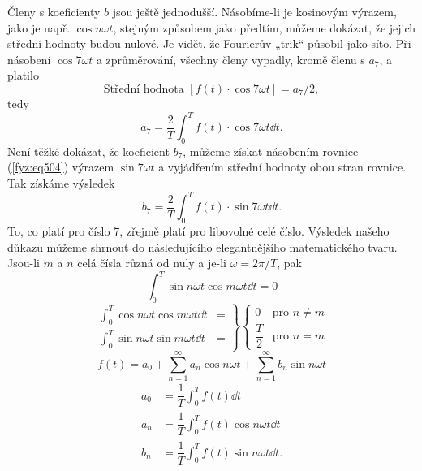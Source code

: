   Členy s koeficienty \(b\) jsou ještě jednodušší. Násobíme-li je kosinovým výrazem, jako je např.
  \(\cos n\omega t\), stejným způsobem jako předtím, můžeme dokázat, že jejich střední hodnoty budou
  nulové. Je vidět, že Fourierův „trik“ působil jako síto. Při násobení \(\cos 7\omega t\) a 
  zprůměrování, všechny členy vypadly, kromě členu s \(a_7\), a platilo 
  \begin{equation}\label{fyz:eq510}
    \text{Střední hodnota }[f(t)\cdot\cos 7\omega t] = a_7/2,
  \end{equation}
  tedy
  \begin{equation}\label{fyz:eq511}
    a_7 = \frac{2}{T}\int_0^Tf(t)\cdot\cos7\omega t \dd{t}.
  \end{equation}
   Není těžké dokázat, že koeficient \(b_7\), můžeme získat násobením rovnice (\ref{fyz:eq504}) 
   výrazem \(\sin 7\omega t\) a vyjádřením střední hodnoty obou stran rovnice. Tak získáme výsledek
  \begin{equation}\label{fyz:eq512}
    b_7 = \frac{2}{T}\int_0^Tf(t)\cdot\sin7\omega t \dd{t}.
  \end{equation}
  To, co platí pro číslo \num{7}, zřejmě platí pro libovolné celé číslo. Výsledek našeho důkazu 
  můžeme shrnout do následujícího elegantnějšího matematického tvaru. Jsou-li \(m\) a \(n\) celá 
  čísla různá od nuly a je-li \(\omega = 2\pi/T\), pak
  \begin{equation}\label{fyz:eq513}
    \int_{0}^{T}\sin n\omega t\cos m\omega t\dd{t} = 0
  \end{equation}
  \begin{equation}\label{fyz:eq514}
    \left.\begin{aligned}
           \int_{0}^{T}\cos n\omega t\cos m\omega t\dd{t} &= \\
           \int_{0}^{T}\sin n\omega t\sin m\omega t\dd{t} &=
          \end{aligned}
    \right\}
    \begin{cases} 
       0             & \text{pro } n \neq m \\
       \dfrac{T}{2}  & \text{pro } n = m
    \end{cases}
  \end{equation}
  \begin{equation}\label{fyz:eq515}
    f(t) = a_0 + \sum_{n=1}^\infty a_n\cos n\omega t + \sum_{n=1}^\infty b_n\sin n\omega t
  \end{equation}
  \begin{subequations}\label{fyz:eq516}
    \begin{align}
      a_0 &= \dfrac{1}{T}\int_{0}^{T}f(t)\dd{t}  \\
      a_n &= \dfrac{1}{T}\int_{0}^{T}f(t)\cos n\omega t\dd{t}   \\
      b_n &= \dfrac{1}{T}\int_{0}^{T}f(t)\sin n\omega t\dd{t}. 
    \end{align}
  \end{subequations}
